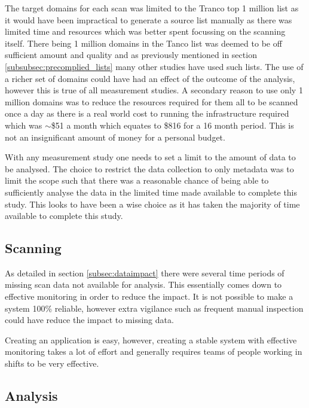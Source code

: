 \documentclass{mscreport}
\begin{document}
\vspace{0.3cm} \noindent
The target domains for each scan was limited to the Tranco top 1 million list as it would have been impractical  to generate a source list manually as there was limited time and resources which was better spent focussing on the scanning itself. There being 1 million domains in the Tanco list was deemed to be off sufficient amount and quality and as previously mentioned in section \ref{subsubsec:precomplied_lists} many other studies have used such lists. The use of a richer set of domains could have had an effect of the outcome of the analysis, however this is true of all measurement studies. A secondary reason to use only 1 million domains was to reduce the resources required for them all to be scanned once a day as there is a real world cost to running the infrastructure required which was $\sim$\$51 a month which equates to \$816 for a 16 month period. This is not an insignificant amount of money for a personal budget.

\vspace{0.3cm} \noindent
With any measurement study one needs to set a limit to the amount of data to be analysed. The choice to restrict the data collection to only metadata was to limit the scope such that there was a reasonable chance of being able to sufficiently analyse the data in the limited time made available to complete this study. This looks to have been a wise choice as it has taken the majority of time available to complete this study.

\subsection{Scanning}

\noindent
As detailed in section \ref{subsec:dataimpact} there were several time periods of missing scan data not available for analysis. This essentially comes down to effective monitoring in order to reduce the impact. It is not possible to make a system 100\% reliable, however extra vigilance such as frequent manual inspection could have reduce the impact to missing data.

\vspace{0.3cm} \noindent
Creating an application is easy, however, creating a stable system with effective monitoring takes a lot of effort and generally requires teams of people working in shifts to be very effective.

\subsection{Analysis}
\end{document}
